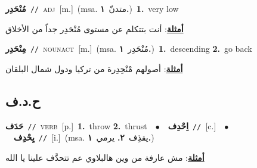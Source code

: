 \documentclass[10pt,a4paper,twoside]{article} %
\begin{document}
\begin{multicols}{2}
{\setlength\topsep{0pt}\textbf{\foreignlanguage{arabic}{مُنْحَدِر}}\ {\color{gray}\texttt{//}\color{black}}\ \textsc{adj}\ [m.]\ \color{gray}(msa. \foreignlanguage{arabic}{متدنّ}~\foreignlanguage{arabic}{\textbf{١.}})\color{black}\ \textbf{1.}~very low\  \begin{flushright}\color{gray}\foreignlanguage{arabic}{\textbf{\underline{\foreignlanguage{arabic}{أمثلة}}}: أنت بتتكلم عن مستوى مُنْحَدِر جداً من الأخلاق}\end{flushright}\color{black}} \vspace{2mm}

{\setlength\topsep{0pt}\textbf{\foreignlanguage{arabic}{مِنْحَدِر}}\ {\color{gray}\texttt{//}\color{black}}\ \textsc{noun\textunderscore act}\ [m.]\ \color{gray}(msa. \foreignlanguage{arabic}{مُنْحَدِر}~\foreignlanguage{arabic}{\textbf{١.}})\color{black}\ \textbf{1.}~descending  \textbf{2.}~go back\  \begin{flushright}\color{gray}\foreignlanguage{arabic}{\textbf{\underline{\foreignlanguage{arabic}{أمثلة}}}: أصولهم مْنْحِدِرة من تركيا ودول شمال البلقان}\end{flushright}\color{black}} \vspace{2mm}

\vspace{-3mm}
\subsection*{\color{blue}\foreignlanguage{arabic}{ح.د.ف}\color{blue}{}} 

{\setlength\topsep{0pt}\textbf{\foreignlanguage{arabic}{حَدَف}}\ {\color{gray}\texttt{//}\color{black}}\ \textsc{verb}\ [p.]\ \textbf{1.}~throw  \textbf{2.}~thrust\ \ $\bullet$\ \ \setlength\topsep{0pt}\textbf{\foreignlanguage{arabic}{اِحْدِف}}\ {\color{gray}\texttt{//}\color{black}}\ [c.]\ \ $\bullet$\ \ \setlength\topsep{0pt}\textbf{\foreignlanguage{arabic}{يِحْدِف}}\ {\color{gray}\texttt{//}\color{black}}\ [i.]\ \color{gray}(msa. \foreignlanguage{arabic}{يقذِف}~\foreignlanguage{arabic}{\textbf{٢.}}  \foreignlanguage{arabic}{يرمي}~\foreignlanguage{arabic}{\textbf{١.}})\color{black}\  \begin{flushright}\color{gray}\foreignlanguage{arabic}{\textbf{\underline{\foreignlanguage{arabic}{أمثلة}}}: مش عارفة من وين هالبلاوي عم تتحدَّف علينا يا الله}\end{flushright}\color{black}} \vspace{2mm}


\end{multicols}
\end{document}
